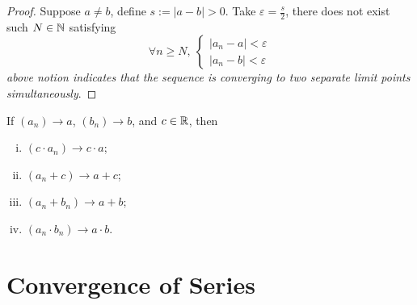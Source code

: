 \documentclass[11pt]{article}
\begin{document}
        \begin{proof}
            Suppose $a \neq b$, define $s:= |a-b| > 0$. Take $\varepsilon = \frac{s}{2}$, there does not exist such $N \in \mathbb{N}$ satisfying 
            \begin{equation}
                \forall n \geq N,\ 
                \begin{cases}
                    |a_n - a| < \varepsilon \\
                    |a_n - b| < \varepsilon
                \end{cases}
            \end{equation}
            \emph{above notion indicates that the sequence is converging to two separate limit points simultaneously}.
        \end{proof}
        
        \begin{theorem}
            If $(a_n) \to a$, $(b_n) \to b$, and $c \in \mathbb{R}$, then
            \begin{enumerate}[(i)]
                \item $(c \cdot a_n) \to c \cdot a$;
                \item $(a_n + c) \to a + c$;
                \item $(a_n + b_n) \to a + b$;
                \item $(a_n \cdot b_n) \to a \cdot b$.
            \end{enumerate}
        \end{theorem}
        
    \section{Convergence of Series}
\end{document}
